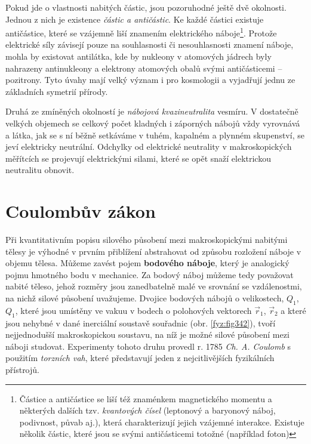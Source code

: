   Pokud jde o vlastnosti nabitých částic, jsou pozoruhodné ještě dvě okolnosti. Jednou z nich je 
  existence \emph{částic a antičástic}. Ke každé částici existuje antičástice, které se vzájemně 
  liší znamením elektrického náboje\footnote{Částice a antičástice se liší též znaménkem
  magnetického momentu a některých dalších tzv. \emph{kvantových čísel} (leptonový a  baryonový 
  náboj, podivnost, půvab aj.), která charakterizují jejich vzájemné interakce. Existuje několik 
  částic, které jsou se svými antičásticemi totožné (například foton)}. Protože elektrické síly 
  závisejí pouze na souhlasnosti či nesouhlasnosti znamení náboje, mohla by existovat antilátka, 
  kde by nukleony v atomových jádrech byly nahrazeny antinukleony a elektrony atomových obalů svými 
  antičásticemi – pozitrony. Tyto úvahy mají velký význam i pro kosmologii a vyjadřují jednu ze 
  základních symetrií přírody.
  
  Druhá ze zmíněných okolností je \emph{nábojová kvazineutralita} vesmíru. V dostatečně velkých 
  objemech se celkový počet kladných i záporných nábojů vždy vyrovnává a látka, jak se s ní běžně 
  setkáváme v tuhém, kapalném a plynném skupenství, se jeví elektricky neutrální. Odchylky od 
  elektrické neutrality v makroskopických měřítcích se projevují elektrickými silami, které se opět 
  snaží elektrickou neutralitu obnovit.
  
\section{Coulombův zákon}\label{fyz:IIIchapIsecII}
  Při kvantitativním popisu silového působení mezi makroskopickými nabitými tělesy je výhodné v 
  prvním přiblížení abstrahovat od způsobu rozložení náboje v objemu tělesa. Můžeme zavést pojem 
  \textbf{bodového náboje}, který je analogický pojmu hmotného bodu v mechanice. Za bodový náboj 
  můžeme tedy považovat nabité těleso, jehož rozměry jsou zanedbatelně malé ve srovnání se 
  vzdálenostmi, na nichž silové působení uvažujeme. Dvojice bodových nábojů o velikostech, 
  \(Q_1\), \(Q_1\), které jsou umístěny ve vakuu v bodech o polohových vektorech \(\vec{r}_1\), 
  \(\vec{r}_2\) a které jsou nehybné v dané inerciální soustavě souřadnic (obr. \ref{fyz:fig342}), 
  tvoří nejjednodušší makroskopickou soustavu, na níž je možné silové působení mezi náboji 
  studovat. Experimenty tohoto druhu provedl r. 1785 \emph{Ch. A. Coulomb} s použitím 
  \emph{torzních vah}, které představují jeden z nejcitlivějších fyzikálních přístrojů. 

